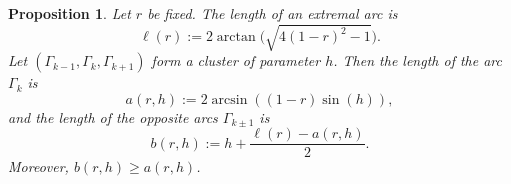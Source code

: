 \documentclass[11pt]{article}
\numberwithin{equation}{section}
\theoremstyle{plain}
\newtheorem{proposition}[theorem]{Proposition}
\theoremstyle{definition}
\let\B\Gamma
\begin{document}
\begin{proposition}\label{prop-clu} Let $r$ be fixed. The length of an extremal arc is
\begin{equation}\label{statement-l}
\ell(r):=2 \arctan\bigl(\sqrt{4(1-r)^2-1}\bigr).
\end{equation}
Let $(\B_{k-1}, \B_k, \B_{k+1})$ form a cluster of parameter $h$. Then the length of the arc $\B_k$ is
\begin{equation}\label{statement-a}
a(r,h):=2 \arcsin((1-r)\sin(h)),
\end{equation}
and the length of the opposite arcs $\B_{k\pm 1}$ is
\begin{equation}\label{statement-b}
b(r,h):=h + \frac{\ell(r)-a(r,h)}{2}.
\end{equation}
Moreover, $b(r,h)\geq a(r,h)$.
\end{proposition}
\end{document}
